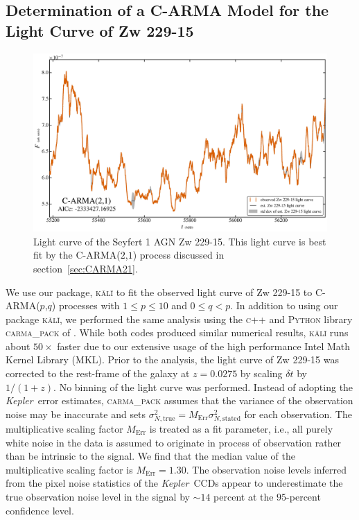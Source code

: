 \documentclass[a4paper,fleqn,usenatbib]{mnras}
\newcommand{\Kepler}{\textit{Kepler~}}
\begin{document}
\subsection[C-ARMA Model for Zw 229-15]{Determination of a C-ARMA Model for the Light Curve of Zw 229-15}\label{sec:Zw229-15CARMA}

\begin{figure}
    \includegraphics[width=\textwidth]{images/Zw229-15_LC.jpg}
    \caption{Light curve of the Seyfert 1 AGN Zw 229-15. This light curve is best fit by the C-ARMA($2$,$1$) process discussed in section~\ref{sec:CARMA21}.}
    \label{fig:Zw229-15_LC}
\end{figure}

We use our package, \textsc{k\={a}l\={i}} to fit the observed light curve of Zw 229-15 to C-ARMA($p$,$q$) processes with $1 \leq p \leq 10$ and $0 \leq q < p$. In addition to using our package \textsc{k\={a}l\={i}}, we performed the same analysis using the \textsc{c++} and \textsc{Python} library \textsc{carma\_pack} of \citet{Kelly14}. While both codes produced similar numerical results, \textsc{k\={a}l\={i}} runs about $50 \times$ faster due to our extensive usage of the high performance Intel Math Kernel Library (MKL). Prior to the analysis, the light curve of Zw 229-15 was corrected to the rest-frame of the galaxy at $z = 0.0275$ by scaling $\delta t$ by $1/(1+z)$. No binning of the light curve was performed. Instead of adopting the \Kepler error estimates, \textsc{carma\_pack} assumes that the variance of the observation noise may be inaccurate and sets $\sigma^{2}_{N,\mathrm{true}} = M_{\mathrm{Err}} \sigma^{2}_{N,\mathrm{stated}}$ for each observation. The multiplicative scaling factor $M_{\mathrm{Err}}$ is treated as a fit parameter, i.e., all purely white noise in the data is assumed to originate in process of observation rather than be intrinsic to the signal. We find that the median value of the multiplicative scaling factor is $M_{\mathrm{Err}} = 1.30$. The observation noise levels inferred from the pixel noise statistics of the \Kepler CCDs appear to underestimate the true observation noise level in the signal by $\sim 14$ percent at the $95$-percent confidence level.
\end{document}
